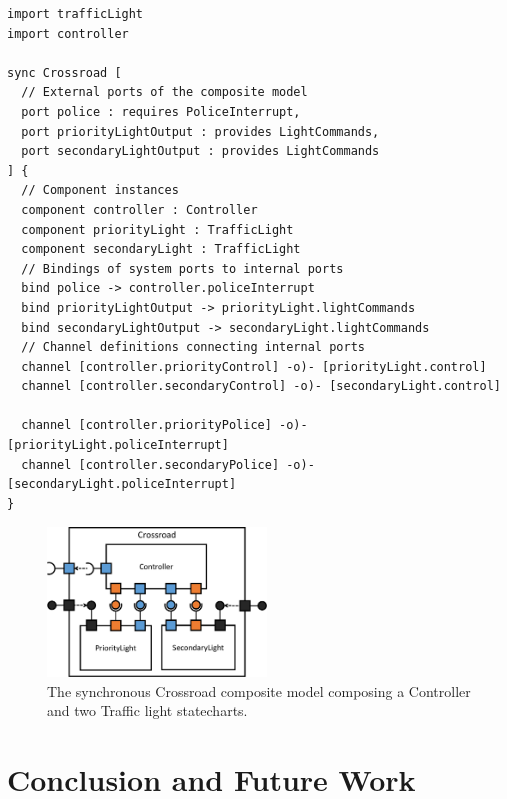 \begin{lstlisting}
import trafficLight
import controller

sync Crossroad [
  // External ports of the composite model
  port police : requires PoliceInterrupt,
  port priorityLightOutput : provides LightCommands,
  port secondaryLightOutput : provides LightCommands
] {
  // Component instances
  component controller : Controller
  component priorityLight : TrafficLight
  component secondaryLight : TrafficLight
  // Bindings of system ports to internal ports
  bind police -> controller.policeInterrupt
  bind priorityLightOutput -> priorityLight.lightCommands
  bind secondaryLightOutput -> secondaryLight.lightCommands
  // Channel definitions connecting internal ports
  channel [controller.priorityControl] -o)- [priorityLight.control]
  channel [controller.secondaryControl] -o)- [secondaryLight.control]

  channel [controller.priorityPolice] -o)- [priorityLight.policeInterrupt]
  channel [controller.secondaryPolice] -o)- [secondaryLight.policeInterrupt]
}
\end{lstlisting}

\begin{figure}[!h]
	\centering
	\includegraphics[width=0.52\textwidth]{figures/Controller-gcd.pdf}
	\caption{The synchronous Crossroad composite model composing a Controller and two Traffic light statecharts.}
	\label{fig:block_diagram_cropped2}
\end{figure}

\section{Conclusion and Future Work}
\label{sec:conclusion}


